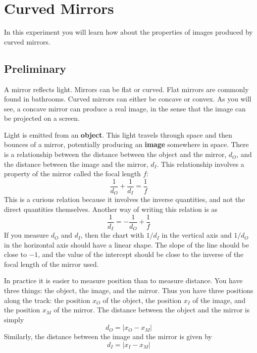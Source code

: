 \setcounter{chapter}{6}
\chapter{Curved Mirrors}
In this experiment you will learn how about the properties of images produced by curved mirrors.
\section{Preliminary}
A mirror reflects light. Mirrors can be flat or curved. Flat mirrors are commonly found in bathrooms. Curved mirrors can either be concave or convex. As you will see, a concave mirror can produce a real image, in the sense that the image can be projected on a screen.

Light is emitted from an \textbf{object}. This light travels through space and then bounces of a mirror, potentially producing an \textbf{image} somewhere in space. There is a relationship between the distance between the object and the mirror, $d_{O}$, and the distance between the image and the mirror, $d_{I}$. This relationship involves a property of the mirror called the focal length $f$:
\begin{equation}
    \frac{1}{d_{O}} + \frac{1}{d_{I}} = \frac{1}{f}
\end{equation}
This is a curious relation because it involves the inverse quantities, and not the direct quantities themselves. Another way of writing this relation is as
\begin{equation}
    \frac{1}{d_{I}} = -\frac{1}{d_{O}} + \frac{1}{f}
\end{equation}
If you measure $d_{O}$ and $d_{I}$, then the chart with $1/d_{I}$ in the vertical axis and $1/d_{O}$ in the horizontal axis should have a linear shape. The slope of the line should be close to $-1$, and the value of the intercept should be close to the inverse of the focal length of the mirror used.

In practice it is easier to measure position than to measure distance. You have three things: the object, the image, and the mirror. Thus you have three positions along the track: the position $x_{O}$ of the object, the position $x_{I}$ of the image, and the position $x_{M}$ of the mirror. The distance between the object and the mirror is simply
\begin{equation}
    d_{O} = \left\vert x_{O} - x_{M} \right\vert
\end{equation}
Similarly, the distance between the image and the mirror is given by
\begin{equation}
    d_{I} = \left\vert x_{I} - x_{M} \right\vert
\end{equation}
